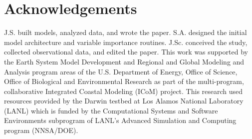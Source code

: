 \documentclass{article}
\begin{document}
\FloatBarrier

\section{Acknowledgements}

J.S. built models, analyzed data, and wrote the paper. S.A. designed the initial model architecture and variable importance routines. J.Sc. conceived the study, collected observational data, and edited the paper. This work was supported by the Earth System Model Development and Regional and Global Modeling and Analysis program areas of the U.S. Department of Energy, Office of Science, Office of Biological and Environmental Research as part of the multi-program, collaborative Integrated Coastal Modeling (ICoM) project. This research used resources provided by the Darwin testbed at Los Alamos National Laboratory (LANL) which is funded by the Computational Systems and Software Environments subprogram of LANL's Advanced Simulation and Computing program (NNSA/DOE).

% 
% 
\printbibliography
\end{document}
